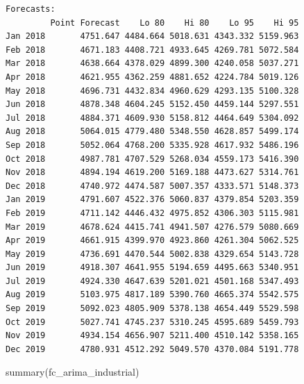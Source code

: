 \documentclass[
  letterpaper,
  DIV=11,
  numbers=noendperiod]{scrartcl}
\newenvironment{Shaded}{\begin{snugshade}}{\end{snugshade}}
\newcommand{\FunctionTok}[1]{\textcolor[rgb]{0.28,0.35,0.67}{#1}}
\newcommand{\NormalTok}[1]{\textcolor[rgb]{0.00,0.23,0.31}{#1}}
\begin{document}
\begin{verbatim}
Forecasts:
         Point Forecast    Lo 80    Hi 80    Lo 95    Hi 95
Jan 2018       4751.647 4484.664 5018.631 4343.332 5159.963
Feb 2018       4671.183 4408.721 4933.645 4269.781 5072.584
Mar 2018       4638.664 4378.029 4899.300 4240.058 5037.271
Apr 2018       4621.955 4362.259 4881.652 4224.784 5019.126
May 2018       4696.731 4432.834 4960.629 4293.135 5100.328
Jun 2018       4878.348 4604.245 5152.450 4459.144 5297.551
Jul 2018       4884.371 4609.930 5158.812 4464.649 5304.092
Aug 2018       5064.015 4779.480 5348.550 4628.857 5499.174
Sep 2018       5052.064 4768.200 5335.928 4617.932 5486.196
Oct 2018       4987.781 4707.529 5268.034 4559.173 5416.390
Nov 2018       4894.194 4619.200 5169.188 4473.627 5314.761
Dec 2018       4740.972 4474.587 5007.357 4333.571 5148.373
Jan 2019       4791.607 4522.376 5060.837 4379.854 5203.359
Feb 2019       4711.142 4446.432 4975.852 4306.303 5115.981
Mar 2019       4678.624 4415.741 4941.507 4276.579 5080.669
Apr 2019       4661.915 4399.970 4923.860 4261.304 5062.525
May 2019       4736.691 4470.544 5002.838 4329.654 5143.728
Jun 2019       4918.307 4641.955 5194.659 4495.663 5340.951
Jul 2019       4924.330 4647.639 5201.021 4501.168 5347.493
Aug 2019       5103.975 4817.189 5390.760 4665.374 5542.575
Sep 2019       5092.023 4805.909 5378.138 4654.449 5529.598
Oct 2019       5027.741 4745.237 5310.245 4595.689 5459.793
Nov 2019       4934.154 4656.907 5211.400 4510.142 5358.165
Dec 2019       4780.931 4512.292 5049.570 4370.084 5191.778
\end{verbatim}

\begin{Shaded}
\begin{Highlighting}[]
\FunctionTok{summary}\NormalTok{(fc\_arima\_industrial)}
\end{Highlighting}
\end{Shaded}
\end{document}
